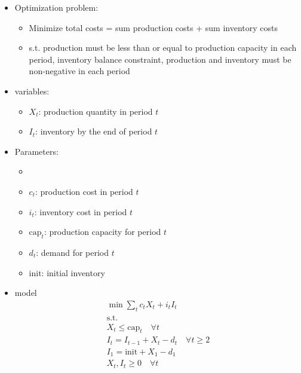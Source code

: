 \documentclass[10pt]{article}
\begin{document}
\begin{itemize}
    \item Optimization problem: 
    \begin{itemize}
        \item Minimize total costs = sum production costs + sum inventory costs 
        \item s.t. production must be less than or equal to production capacity in each period, inventory balance constraint, production and inventory must be non-negative in each period
    \end{itemize}
    \item variables: 
    \begin{itemize}
        \item $X_t$: production quantity in period $t $
        \item $I_t $: inventory by the end of period $t $
    \end{itemize}
    \item Parameters:
    \begin{itemize}
        \item 
        \item $c_t $: production cost in period $t $
        \item $i_t$: inventory cost in period $t $
        \item $\text{cap}_t $: production capacity for period $t $
        \item $d_t $: demand for period $t $
        \item $\text{init} $: initial inventory 
    \end{itemize}
    \item model 
    \begin{gather*}
        \min \sum_t c_tX_t + i_tI_t\\
        \text{s.t.}\\
        X_t\le \text{cap}_t\quad\forall t\\
        I_t = I_{t - 1} + X_t - d_t\quad\forall t\ge 2\\
        I_1 = \text{init} + X_1 - d_1\\
        X_t, I_t \ge 0\quad\forall t
    \end{gather*}
\end{itemize}
\newpage 
\end{document}

